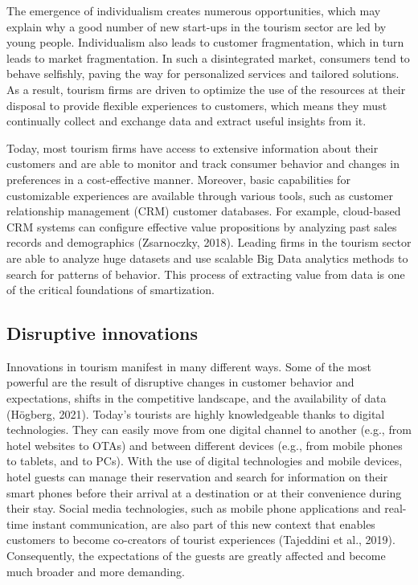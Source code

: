 \documentclass[
  letterpaper,
  DIV=11,
  numbers=noendperiod]{scrreprt}
\begin{document}
The emergence of individualism creates numerous opportunities, which may
explain why a good number of new start-ups in the tourism sector are led
by young people. Individualism also leads to customer fragmentation,
which in turn leads to market fragmentation. In such a disintegrated
market, consumers tend to behave selfishly, paving the way for
personalized services and tailored solutions. As a result, tourism firms
are driven to optimize the use of the resources at their disposal to
provide flexible experiences to customers, which means they must
continually collect and exchange data and extract useful insights from
it.

Today, most tourism firms have access to extensive information about
their customers and are able to monitor and track consumer behavior and
changes in preferences in a cost-effective manner. Moreover, basic
capabilities for customizable experiences are available through various
tools, such as customer relationship management (CRM) customer
databases. For example, cloud-based CRM systems can configure effective
value propositions by analyzing past sales records and demographics
(Zsarnoczky, 2018). Leading firms in the tourism sector are able to
analyze huge datasets and use scalable Big Data analytics methods to
search for patterns of behavior. This process of extracting value from
data is one of the critical foundations of smartization.

\hypertarget{disruptive-innovations}{%
\subsection{Disruptive innovations}\label{disruptive-innovations}}

Innovations in tourism manifest in many different ways. Some of the most
powerful are the result of disruptive changes in customer behavior and
expectations, shifts in the competitive landscape, and the availability
of data (Högberg, 2021). Today's tourists are highly knowledgeable
thanks to digital technologies. They can easily move from one digital
channel to another (e.g., from hotel websites to OTAs) and between
different devices (e.g., from mobile phones to tablets, and to PCs).
With the use of digital technologies and mobile devices, hotel guests
can manage their reservation and search for information on their smart
phones before their arrival at a destination or at their convenience
during their stay. Social media technologies, such as mobile phone
applications and real-time instant communication, are also part of this
new context that enables customers to become co-creators of tourist
experiences (Tajeddini et al., 2019). Consequently, the expectations of
the guests are greatly affected and become much broader and more
demanding.
\end{document}
